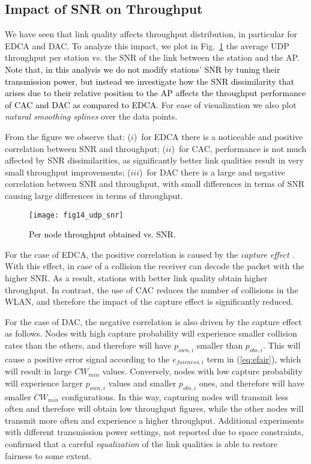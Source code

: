 \documentclass[a4paper,10pt]{article}
\newcommand{\revs}[1]{\textcolor{black}{#1}}
\begin{document}
\subsection{Impact of SNR on Throughput}
\label{sec:snr}

We have seen that link quality affects throughput distribution, in particular for EDCA and DAC. To analyze this impact, we plot in Fig.~\ref{fig:throughput_snr} the average UDP throughput per station vs. the SNR of the link between the station and the AP. \revs{Note that, in this analysis we do not modify stations' SNR by tuning their transmission power, but instead we investigate how the SNR dissimilarity that arises due to their relative position to the AP affects the throughput performance of CAC and DAC as compared to EDCA.} For ease of visualization we also plot \emph{natural smoothing splines} over the data points. 

From the figure we observe that: ($i$)~for EDCA there is a noticeable and positive correlation between SNR and throughput; ($ii$)~for CAC, performance is not much affected by SNR dissimilarities, as significantly better link qualities result in very small throughput improvements; ($iii$)~for DAC there is a large and negative correlation between SNR and throughput, with small differences in terms of SNR causing large differences in terms of throughput.  

\begin{figure}\texttt{[image: fig14\_udp\_snr]}\caption{\revs{Per node throughput obtained vs. SNR.}}\label{fig:throughput_snr}\end{figure}

For the case of EDCA, the positive correlation is caused by the \emph{capture effect} \revs{\cite{hadzi02}}. With this effect, in case of a collision the receiver can decode the packet with the higher SNR. As a result, stations with better link quality obtain higher throughput. In contrast, the use of CAC reduces the number of collisions in the WLAN, and therefore the impact of the capture effect is significantly reduced. 



For the case of DAC, the negative correlation is also driven by the capture effect as follows. Nodes with high capture probability will experience smaller collision rates than the others, and therefore will have $p_{own,i}$ smaller than $p_{obs,i}$. This will cause a positive error signal according to the $e_{fairness,i}$ term in (\ref{eq:efair}), which will result in large $CW_{min}$ values. Conversely, nodes with low capture probability will experience larger $p_{own,i}$ values and smaller $p_{obs,i}$ ones, and therefore will have smaller $CW_{min}$ configurations. In this way, capturing nodes will transmit less often and therefore will obtain low throughput figures, while the other nodes will transmit more often and experience a higher throughput. Additional experiments with different transmission power settings, not reported due to space constraints, confirmed that a careful \emph{equalization} of the link qualities is able to restore fairness to some extent. 
\end{document}
